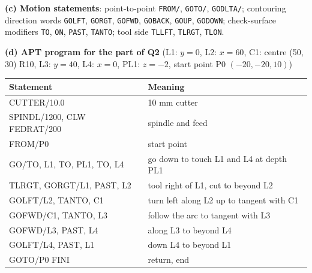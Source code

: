 \documentclass[11pt,a4paper]{article}
\begin{document}
\begin{enumerate}
\begin{answer}
			\textbf{(c) Motion statements}: point-to-point \texttt{FROM/}, \texttt{GOTO/}, \texttt{GODLTA/}; contouring direction words \texttt{GOLFT}, \texttt{GORGT}, \texttt{GOFWD}, \texttt{GOBACK}, \texttt{GOUP}, \texttt{GODOWN}; check-surface modifiers \texttt{TO}, \texttt{ON}, \texttt{PAST}, \texttt{TANTO}; tool side \texttt{TLLFT}, \texttt{TLRGT}, \texttt{TLON}.

			\textbf{(d) APT program for the part of Q2} (L1: $y=0$, L2: $x=60$, C1: centre (50, 30) R10, L3: $y=40$, L4: $x=0$, PL1: $z=-2$, start point P0 $(-20,-20,10)$)
			\begin{center}
				\small
				\begin{tabular}{@{}>{\ttfamily}l>{\footnotesize}l@{}}
					\toprule
					\textrm{\textbf{Statement}} & \textbf{Meaning} \\
					\midrule
					CUTTER/10.0                  & 10 mm cutter \\
					SPINDL/1200, CLW \quad FEDRAT/200 & spindle and feed \\
					FROM/P0                      & start point \\
					GO/TO, L1, TO, PL1, TO, L4   & go down to touch L1 and L4 at depth PL1 \\
					TLRGT, GORGT/L1, PAST, L2    & tool right of L1, cut to beyond L2 \\
					GOLFT/L2, TANTO, C1          & turn left along L2 up to tangent with C1 \\
					GOFWD/C1, TANTO, L3          & follow the arc to tangent with L3 \\
					GOFWD/L3, PAST, L4           & along L3 to beyond L4 \\
					GOLFT/L4, PAST, L1           & down L4 to beyond L1 \\
					GOTO/P0 \quad FINI           & return, end \\
					\bottomrule
				\end{tabular}
			\end{center}
		\end{answer}

	\end{enumerate}
\end{document}
